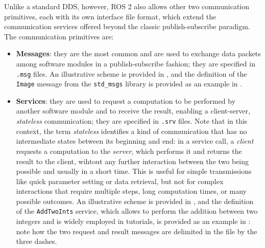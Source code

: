 Unlike a standard DDS, however, ROS 2 also allows other two communication primitives, each with its own interface file format, which extend the communication services offered beyond the classic publish-subscribe paradigm. The communication primitives are:
\begin{itemize}
  \item \textbf{Messages}: they are the most common and are used to exchange data packets among software modules in a publish-subscribe fashion; they are specified in \texttt{.msg} files. An illustrative scheme is provided in , and the definition of the \texttt{Image} message from the \texttt{std\_msgs} library is provided as an example in .
  \item \textbf{Services}: they are used to request a computation to be performed by another software module and to receive the result, enabling a client-server, \emph{stateless} communication; they are specified in \texttt{.srv} files. Note that in this context, the term \emph{stateless} identifies a kind of communication that has no intermediate states between its beginning and end: in a service call, a \emph{client} requests a computation to the \emph{server}, which performs it and returns the result to the client, wihtout any further interaction between the two being possible and usually in a short time. This is useful for simple transmissions like quick parameter setting or data retrieval, but not for complex interactions that require multiple steps, long computation times, or many possible outcomes. An illustrative scheme is provided in , and the definition of the \texttt{AddTwoInts} service, which allows to perform the addition between two integers and is widely employed in tutorials, is provided as an example in : note how the two request and result messages are delimited in the file by the three dashes.

\end{itemize}
